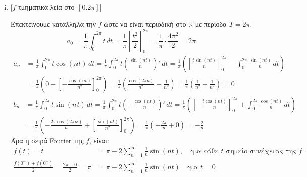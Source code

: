 \documentclass[a4paper,table]{report}
\begin{document}
\begin{solution}
\item {}
  \begin{enumerate}[i)]
    \item 
      \begin{minipage}[t]{0.57\textwidth}
        [$f$ τμηματικά λεία στο $ [0.2 \pi] $]
      \end{minipage}

      Επεκτείνουμε κατάλληλα την $f$ ώστε να είναι περιοδική στο $\mathbb{R}$ 
      με περίοδο $ T=2 \pi $.
      \[
        a_{0} = \frac{1}{\pi} \int _{0}^{2 \pi} t\,{dt} = \frac{1}{\pi}
        \left[\frac{t^{2}}{2}\right]_{0}^{2 \pi} = \frac{1}{\pi} \cdot 
        \frac{4 \pi ^{2}}{2} = 2 \pi
      \] 
      \begin{align*}
        a_{n} &= \frac{1}{\pi} \int _{0}^{2 \pi} t \cos{(nt)} \,{dt} = \frac{1}{\pi} 
        \int _{0}^{2 \pi} t \left(\frac{\sin{(nt)}}{n}\right)' \,{dt} = \frac{1}{\pi}
        \left(\left[\frac{t \sin{(nt)}}{n} \right]_{0}^{2 \pi} - \int _{0}^{2 \pi}
        \frac{\sin{(nt)}}{n} \,{dt}\right) \\ 
              &= \frac{1}{\pi} \left(0 - \left[- \frac{\cos{(nt)}}{n^{2}}\right]_{0}^{2 
                \pi}\right) = \frac{1}{\pi} \left(\frac{\cos{(2 \pi n)}}{n^{2}} - 
                  \frac{1}{n^{2}}\right) = \frac{1}{\pi} \left(\frac{1}{n^{2}} - 
                \frac{1}{n^{2}}\right) = 0
      \end{align*} 
      \begin{align*}
        b_{n} &= \frac{1}{\pi} \int _{0}^{2 \pi} t \sin{(nt)} \,{dt} = \frac{1}{\pi} 
        \int _{0}^{2 \pi } t \left(- \frac{\cos{(nt)}}{n}\right)' \,{dt} = \frac{1}{\pi}
        \left(\left[- \frac{t \cos{(nt)}}{n} \right]_{0}^{2 \pi} + \int _{0}^{2 \pi}
        \frac{\cos{(nt)}}{n} \,{dt}\right) \\
              &= \frac{1}{\pi} \left(- \frac{2 \pi \cos{(2 \pi n)}}{n} + \left[
              \frac{\sin{(nt)}}{n^{2}}\right]_{0}^{2 \pi}\right) = 
              \frac{1}{\pi} \left(- \frac{2 \pi}{n} + 0\right) = - \frac{2}{n} 
      \end{align*}
      Άρα η σειρά \textlatin{Fourier} της $f$, είναι:
      \begin{align*}
        f(t) = t &= \pi - 2\sum_{n=1}^{\infty} \frac{1}{n} \sin{(nt)} , 
        \quad \text{για κάθε $t$ σημείο συνέχειας της $f$} \\
        \frac{f(0^{-})+f(0^{+})}{2} = \frac{2 \pi - 0 }{2} = \pi 
                 &= \pi - 2\sum_{n=1}^{\infty} \frac{1}{n} \sin{(nt)} 
                 \quad \text{για $t=0$} 
      \end{align*}


\end{enumerate}
\end{solution}
\end{document}
